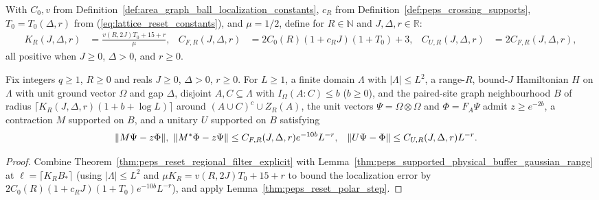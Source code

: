 \begin{definition}
    \label{def:peps_reset_constants_range}
    \leanok
    With $C_0,v$ from Definition~\ref{def:area_graph_ball_localization_constants}, $c_R$ from Definition~\ref{def:peps_crossing_supports}, $T_0=T_0(\Delta,r)$ from (\ref{eq:lattice_reset_constants}), and $\mu=1/2$, define for $R\in\mathbb N$ and $J,\Delta,r\in\mathbb R$:
    \begin{align}
        K_R(J,\Delta,r)     & =\frac{v(R,2J)T_0+15+r}{\mu}, &
        C_{F,R}(J,\Delta,r) & =2C_0(R)(1+c_RJ)(1+T_0)+3,    &
        C_{U,R}(J,\Delta,r) & =2C_{F,R}(J,\Delta,r),
        \label{eq:peps_reset_constants_range}
    \end{align}
    all positive when $J\ge0$, $\Delta>0$, and $r\ge0$.
\end{definition}

\begin{lemma}
    \label{thm:peps_reset_unitary_range}
    \leanok
    Fix integers $q\ge1$, $R\ge0$ and reals $J\ge0$, $\Delta>0$, $r\ge0$. For $L\ge1$, a finite domain $\Lambda$ with $|\Lambda|\le L^2$, a range-$R$, bound-$J$ Hamiltonian $H$ on $\Lambda$ with unit ground vector $\Omega$ and gap $\Delta$, disjoint $A,C\subseteq\Lambda$ with $I_\Omega(A:C)\le b$ ($b\ge0$), and the paired-site graph neighbourhood $B$ of radius $\lceil K_R(J,\Delta,r)(1+b+\log L)\rceil$ around $(A\cup C)^c\cup Z_R(A)$, the unit vectors $\Psi=\Omega\otimes\Omega$ and $\Phi=F_A\Psi$ admit $z\ge e^{-2b}$, a contraction $M$ supported on $B$, and a unitary $U$ supported on $B$ satisfying
    \begin{align}
        \|M\Psi-z\Phi\|,\ \|M^*\Phi-z\Psi\| & \le C_{F,R}(J,\Delta,r)e^{-10b}L^{-r}, &
        \|U\Psi-\Phi\|                      & \le C_{U,R}(J,\Delta,r)L^{-r}. \notag
    \end{align}
\end{lemma}
\begin{proof}
    \leanok
    Combine Theorem~\ref{thm:peps_reset_regional_filter_explicit} with Lemma~\ref{thm:peps_supported_physical_buffer_gaussian_range} at $\ell=\lceil K_RB_*\rceil$ (using $|\Lambda|\le L^2$ and $\mu K_R=v(R,2J)T_0+15+r$ to bound the localization error by $2C_0(R)(1+c_RJ)(1+T_0)e^{-10b}L^{-r}$), and apply Lemma~\ref{thm:peps_reset_polar_step}.
\end{proof}

